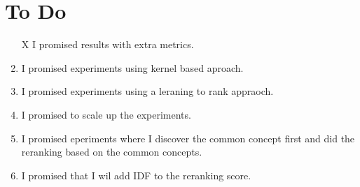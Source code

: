 \documentclass{article}
\renewcommand{\bullet}[0]{$\blacktriangleright$}
\begin{document}

\section{To Do}
\label{sec:todo}
\begin{enumerate}
\item [X] I promised results with extra metrics.
\item I promised experiments using kernel based aproach.
\item I promised experiments using a leraning to rank appraoch.
\item I promised to scale up the experiments.
\item I promised eperiments where I discover the common concept first and did
  the reranking based on the common concepts.
\item I promised that I wil add IDF to the reranking score.
\end{enumerate}
\end{document}
